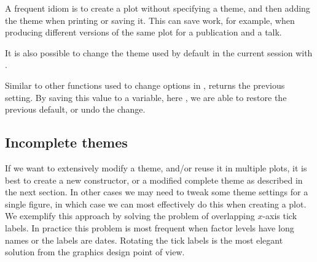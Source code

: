 \documentclass[krantz2]{krantz}\usepackage{knitr}
\begin{document}
A frequent idiom is to create a plot without specifying a theme, and then adding the theme when printing or saving it. This can save work, for example, when producing different versions of the same plot for a publication and a talk.

\begin{knitrout}\footnotesize
{}\color{fgcolor}\begin{kframe}
\begin{alltt}
 \hlkwb{<-}   \hlopt{+}
       \hlstd{()}
 \hlopt{+} \hlstd{())}
\end{alltt}
\end{kframe}
\end{knitrout}

It is also possible to change the theme used by default in the current \Rlang session with .

\begin{knitrout}\footnotesize
{}\color{fgcolor}\begin{kframe}
\begin{alltt}
 \hlkwb{<-} \hlstd{(}\hlstd{(}\hlstd{))}
\end{alltt}
\end{kframe}
\end{knitrout}

Similar to other functions used to change options in \Rlang,  returns the previous setting. By saving this value to a variable, here , we are able to restore the previous default, or undo the change.

\begin{knitrout}\footnotesize
{}\color{fgcolor}\begin{kframe}
\begin{alltt}
\end{alltt}
\end{kframe}
\end{knitrout}

\subsection{Incomplete themes}
If we want to extensively modify a theme, and/or reuse it in multiple plots, it is best to create a new constructor, or a modified complete theme as described in the next section. In other cases we may need to tweak some theme settings for a single figure, in which case we can most effectively do this when creating a plot. We exemplify this approach by solving the problem of overlapping $x$-axis tick labels. In practice this problem is most frequent when factor levels have long names or the labels are dates. Rotating the tick labels is the most elegant solution from the graphics design point of view.
\end{document}

